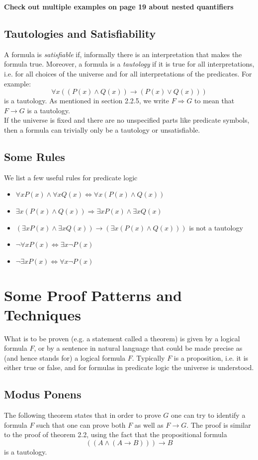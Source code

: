 \documentclass[a4paper]{report}
\begin{document}
\noindent\textbf{Check out multiple examples on page 19 about nested quantifiers}

\subsection{Tautologies and Satisfiability}
A formula is \emph{satisfiable} if, informally there is an interpretation that makes the formula true. Moreover, a formula is a \emph{tautology} if it is true for all interpretations, i.e. for all choices of the universe and for all interpretations of the predicates. For example:
\[\forall x ((P(x)\land Q(x))\to (P(x)\lor Q(x)))\]
is a tautology. As mentioned in section 2.2.5, we write $F\Longrightarrow G$ to mean that $F\to G$ is a tautology.\\

If the universe is fixed and there are no unspecified parts like predicate symbols, then a formula can trivially only be a tautology or unsatisfiable. 

\subsection{Some Rules}
We list a few useful rules for predicate logic
\begin{itemize}
\item $\forall x P(x)\land\forall x Q(x)\Longleftrightarrow \forall x(P(x)\land Q(x))$
\item $\exists x(P(x)\land Q(x))\Longrightarrow \exists x P(x)\land \exists x Q(x)$
\item $(\exists x P(x)\land \exists x Q(x))\to (\exists x(P(x)\land Q(x)))$ is not a tautology
\item $\lnot\forall xP(x)\Longleftrightarrow\exists x\lnot P(x)$
\item $\lnot\exists xP(x)\Longleftrightarrow\forall x\lnot P(x)$
\end{itemize}

\section{Some Proof Patterns and Techniques}
What is to be proven (e.g. a statement called a theorem) is given by a logical formula $F$, or by a sentence in natural language that could be made precise as (and hence stands for) a logical formula $F$. Typically $F$ is a proposition, i.e. it is either true or false, and for formulas in predicate logic the universe is understood. 
\subsection{Modus Ponens}
The following theorem states that in order to prove $G$ one can try to identify a formula $F$ such that one can prove both $F$ as well as $F\to G$. The proof is similar to the proof of theorem 2.2, using the fact that the propositional formula 
\[\left((A\land (A\to B)) \right)\to B\]
is a tautology. 
\end{document}
